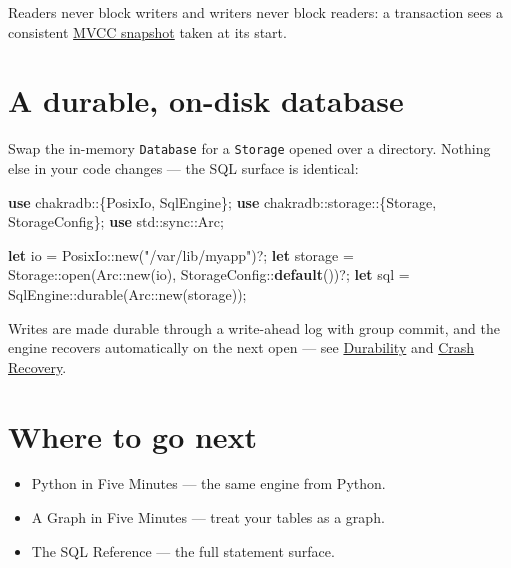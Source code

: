 \documentclass[
  11pt,
  openany]{book}
\newenvironment{Shaded}{}{}
\newcommand{\KeywordTok}[1]{\textcolor[rgb]{0.00,0.44,0.13}{\textbf{#1}}}
\newcommand{\NormalTok}[1]{#1}
\newcommand{\OperatorTok}[1]{\textcolor[rgb]{0.40,0.40,0.40}{#1}}
\newcommand{\PreprocessorTok}[1]{\textcolor[rgb]{0.74,0.48,0.00}{#1}}
\newcommand{\StringTok}[1]{\textcolor[rgb]{0.25,0.44,0.63}{#1}}
\providecommand{\tightlist}{%
  \setlength{\itemsep}{0pt}\setlength{\parskip}{0pt}}
\begin{document}
Readers never block writers and writers never block readers: a
transaction sees a consistent \href{../engine/mvcc.md}{MVCC snapshot}
taken at its start.

\section{A durable, on-disk database}\label{a-durable-on-disk-database}

Swap the in-memory \texttt{Database} for a \texttt{Storage} opened over
a directory. Nothing else in your code changes --- the SQL surface is
identical:

\begin{Shaded}
\begin{Highlighting}[]
\KeywordTok{use} \PreprocessorTok{chakradb::}\OperatorTok{\{}\NormalTok{PosixIo}\OperatorTok{,}\NormalTok{ SqlEngine}\OperatorTok{\};}
\KeywordTok{use} \PreprocessorTok{chakradb::storage::}\OperatorTok{\{}\NormalTok{Storage}\OperatorTok{,}\NormalTok{ StorageConfig}\OperatorTok{\};}
\KeywordTok{use} \PreprocessorTok{std::sync::}\NormalTok{Arc}\OperatorTok{;}

\KeywordTok{let}\NormalTok{ io }\OperatorTok{=} \PreprocessorTok{PosixIo::}\NormalTok{new(}\StringTok{"/var/lib/myapp"}\NormalTok{)}\OperatorTok{?;}
\KeywordTok{let}\NormalTok{ storage }\OperatorTok{=} \PreprocessorTok{Storage::}\NormalTok{open(}\PreprocessorTok{Arc::}\NormalTok{new(io)}\OperatorTok{,} \PreprocessorTok{StorageConfig::}\KeywordTok{default}\NormalTok{())}\OperatorTok{?;}
\KeywordTok{let}\NormalTok{ sql }\OperatorTok{=} \PreprocessorTok{SqlEngine::}\NormalTok{durable(}\PreprocessorTok{Arc::}\NormalTok{new(storage))}\OperatorTok{;}
\end{Highlighting}
\end{Shaded}

Writes are made durable through a write-ahead log with group commit, and
the engine recovers automatically on the next open --- see
\href{../engine/durability.md}{Durability} and
\href{../engine/durability.md}{Crash Recovery}.

\section{Where to go next}\label{where-to-go-next}

\begin{itemize}
\tightlist
\item
  Python in Five Minutes --- the same engine from Python.
\item
  A Graph in Five Minutes --- treat your tables as a graph.
\item
  The SQL Reference --- the full statement surface.
\end{itemize}
\end{document}
